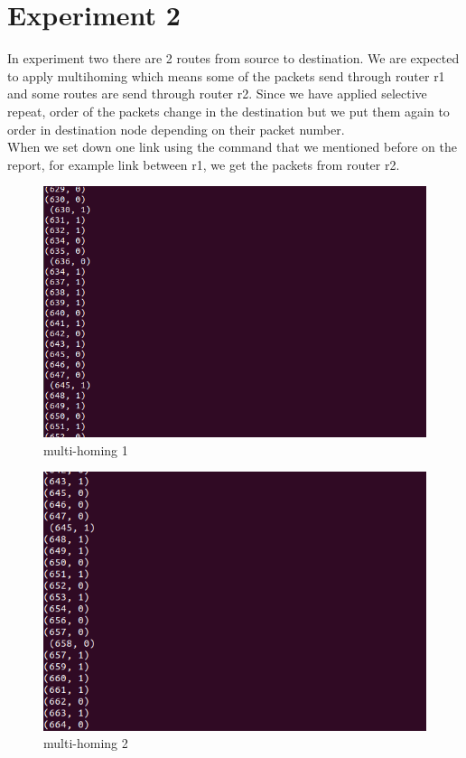 \documentclass[conference]{IEEEtran}
\begin{document}
\section{Experiment 2}
In experiment two there are 2 routes from source to destination. We are expected to apply multihoming which means some of the packets send through router r1 and some routes are send through router r2. Since we have applied selective repeat, order of the packets change in the destination but we put them again to order in destination node depending on their packet number. \\
When we set down one link using the command that we mentioned before on the report, for example link between r1, we get the packets from router r2.
\\
\begin{figure}[h]
\includegraphics[scale = 0.38]{mh1.png}
\caption{multi-homing 1}
\end{figure}
 \FloatBarrier
 \begin{figure}[h]
\includegraphics[scale = 0.38]{mh2.png}
\caption{multi-homing 2}
\end{figure}
\end{document}
